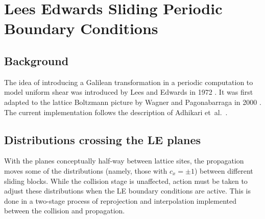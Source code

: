 %
%
%
%
%
%


\section{Lees Edwards Sliding Periodic Boundary Conditions}

\subsection{Background}

The idea of introducing a Galilean transformation in a periodic
computation to model uniform shear was introduced by Lees and
Edwards in 1972 \cite{lees-edwards1972}. It was first adapted
to the lattice Boltzmann picture by Wagner and Pagonabarraga
in 2000 \cite{wagner-pagonabarraga2002}. The current
implementation follows the description of Adhikari
et~al.\ \cite{adhikari-desplat2005}.

\subsection{Distributions crossing the LE planes}

With the planes conceptually half-way between lattice sites, the
propagation moves some of the distributions (namely, those with
$c_x = \pm1$) between different sliding blocks. While the collision
stage is unaffected, action must be taken to adjust these
distributions when the LE boundary conditions are active. This
is done in a two-stage process of reprojection and interpolation
implemented between the collision and propagation.

